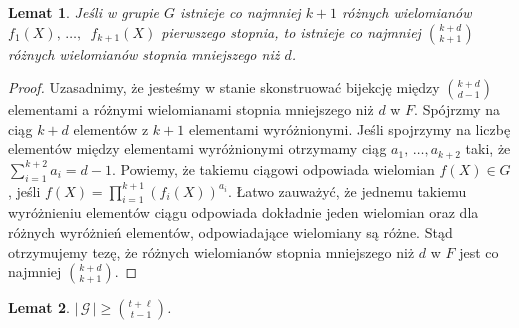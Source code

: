 \documentclass[declaration,shortabstract]{iithesis}
\theoremstyle{definition}
\theoremstyle{remark} \newtheorem{observation}{Obserwacja}
\theoremstyle{plain} \newtheorem{theorem}{Twierdzenie}
\theoremstyle{plain} \newtheorem{lemma}{Lemat}
\theoremstyle{remark} \newtheorem*{remark*}{Uwaga}
\theoremstyle{reminder} \newtheorem*{reminder*}{Przypomnienie}
\begin{document}
\begin{lemma}\label{liczba_wielo}
	Jeśli w grupie $G$ istnieje co najmniej $k + 1$ różnych wielomianów $f_1(X), \, \dots,$ $\,f_{k + 1}(X)$ pierwszego stopnia, to istnieje co najmniej ${k + d \choose k + 1}$ różnych wielomianów stopnia mniejszego niż $d$.
\end{lemma}
	
\begin{proof}
	Uzasadnimy, że jesteśmy w stanie skonstruować bijekcję między ${k + d \choose d - 1}$ elementami a różnymi wielomianami stopnia mniejszego niż $d$ w $F$. Spójrzmy na ciąg $k + d$ elementów z $k + 1$ elementami wyróżnionymi. Jeśli spojrzymy na liczbę elementów między elementami wyróżnionymi otrzymamy ciąg $a_1, \, \dots, a_{k + 2}$ taki, że $\sum_{i = 1}^{k + 2}a_i = d - 1$.  Powiemy, że takiemu ciągowi odpowiada wielomian $f(X) \in G$, jeśli $f(X) = \prod_{i = 1}^{k + 1} (f_i(X))^{a_i}$. Łatwo zauważyć, że jednemu takiemu wyróżnieniu elementów ciągu odpowiada dokładnie jeden wielomian oraz dla różnych wyróżnień elementów, odpowiadające wielomiany są różne. Stąd otrzymujemy tezę, że różnych wielomianów stopnia mniejszego niż $d$ w $F$ jest co najmniej ${k + d \choose k + 1}$.
\end{proof}
	
\begin{lemma} \label{lower}
	$| \, \mathcal{G} \,| \geq {t + \ell \choose t - 1}$.
\end{lemma}
	
\end{document}
